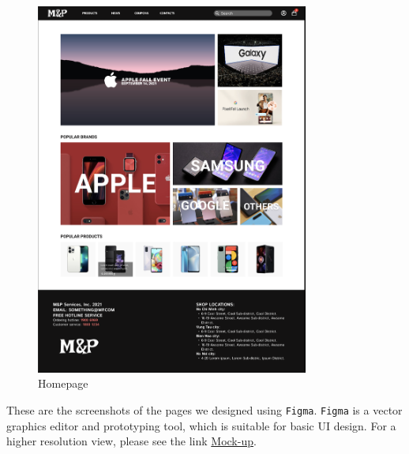 \documentclass[a4paper]{article}
\numberwithin{equation}{section}
\begin{document}
\begin{figure}
  \centering
  \includegraphics[width=0.8\textwidth]{assets/p2/p1.png}
  \caption{Homepage}
\end{figure}

These are the screenshots of the pages we designed using \texttt{Figma}.
\texttt{Figma} is a vector graphics editor and prototyping tool, which is suitable for basic UI design.
For a higher resolution view, please see the link \href{https://www.figma.com/proto/VaFUVfikhd1N98XmaqhA4p/Mock-up?node-id=35\%3A2504&scaling=scale-down-width&page-id=0\%3A1}{Mock-up}.
\end{document}

